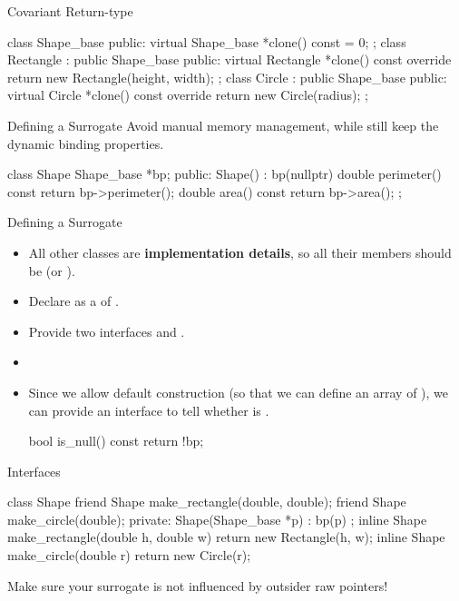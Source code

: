 \documentclass{beamer}
\begin{document}
\begin{frame}[fragile]{Covariant Return-type}
    \begin{cpp}
class Shape_base {
 public:
  virtual Shape_base *clone() const = 0;
};
class Rectangle : public Shape_base {
 public:
  virtual Rectangle *clone() const override
    { return new Rectangle(height, width); }
};
class Circle : public Shape_base {
 public:
  virtual Circle *clone() const override
    { return new Circle(radius); }
};
    \end{cpp}
\end{frame}

\begin{frame}[fragile]{Defining a Surrogate}
    Avoid manual memory management, while still keep the dynamic binding properties.
    \begin{cpp}
class Shape {
  Shape_base *bp;
 public:
  Shape() : bp(nullptr) {}
  double perimeter() const {
    return bp->perimeter();
  }
  double area() const {
      return bp->area();
  }
};
    \end{cpp}
\end{frame}

\begin{frame}[fragile]{Defining a Surrogate}
    \begin{itemize}
        \item All other classes are \textbf{implementation details}, so all their members should be \private (or ).
        \item Declare  as a  of .
        \item Provide two interfaces  and .
        \item {}
        \pause
        \item Since we allow default construction (so that we can define an array of ), we can provide an interface to tell whether  is .
        \begin{cpp}
bool is_null() const { return !bp; }
        \end{cpp}
    \end{itemize}
\end{frame}

\begin{frame}[fragile]{Interfaces}
    \begin{cpp}
class Shape {
  friend Shape make_rectangle(double, double);
  friend Shape make_circle(double);
 private:
  Shape(Shape_base *p) : bp(p) {}
};
inline Shape make_rectangle(double h, double w)
  { return new Rectangle(h, w); }
inline Shape make_circle(double r)
  { return new Circle(r); }
    \end{cpp}
    Make sure your surrogate is not influenced by outsider raw pointers!
\end{frame}
\end{document}
